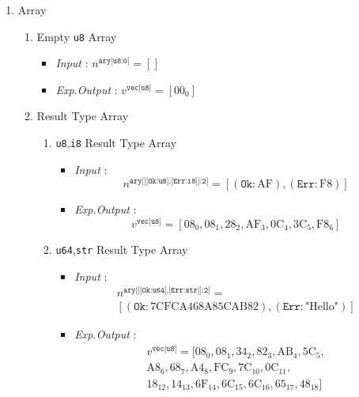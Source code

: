 \documentclass[../alan-handbook.tex]{subfiles}
\begin{document}
\begin{enumerate}
    \item Array 
        \begin{enumerate}
            \item Empty \texttt{u8} Array
                \begin{itemize}
                    \item \textit{Input} : $n^{\texttt{ary[u8:0]}} = []$
                    \item \textit{Exp.Output} : $v^{\texttt{vec[u8]}} = [\text{00}_0]$
                \end{itemize}
            \item Result Type Array
            \begin{enumerate}
                \item \texttt{u8},\texttt{i8} Result Type Array
                    \begin{itemize}
                        \item \textit{Input} : $$n^{\texttt{ary[[[Ok:u8],[Err:i8]]:2]}} = [(\texttt{Ok}:\text{AF}),(\texttt{Err}:\text{F8})]$$
                        \item \textit{Exp.Output} : $$v^{\texttt{vec[u8]}} = [\text{08}_0,\text{08}_1,\text{28}_2,\text{AF}_3,\text{0C}_4,\text{3C}_5,\text{F8}_6]$$
                    \end{itemize}
                \item \texttt{u64},\texttt{str} Result Type Array
                    \begin{itemize}
                        \item \textit{Input} : $$\begin{matrix}n^{\texttt{ary[[[Ok:u64],[Err:str]]:2]}} = \\ [(\texttt{Ok}:\text{7CFCA468A85CAB82}),(\texttt{Err}:\text{"Hello"})]\end{matrix}$$
                        \item \textit{Exp.Output} : $$\begin{matrix}v^{\texttt{vec[u8]}} = [\text{08}_0,\text{08}_1,\text{34}_2,\text{82}_3, \text{AB}_4,\text{5C}_5, \\ \text{A8}_6,\text{68}_7, \text{A4}_8,\text{FC}_9, \text{7C}_{10}, \text{0C}_{11}, \\ \text{18}_{12}, \text{14}_{13}, \text{6F}_{14},\text{6C}_{15},\text{6C}_{16},\text{65}_{17},\text{48}_{18}]\end{matrix}$$
                    \end{itemize}

\end{enumerate}
\end{enumerate}
\end{enumerate}
\end{document}
